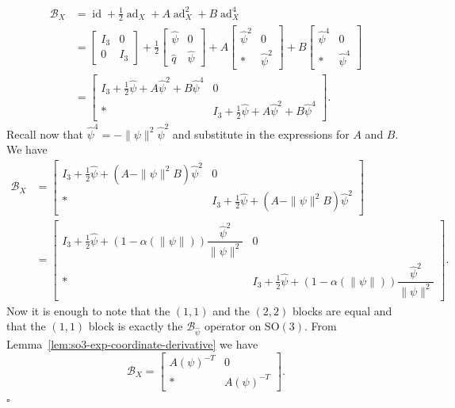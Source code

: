 \documentclass[11pt]{article}
\newcommand{\SO}{\mathrm{SO}}
\newcommand{\ad}{\operatorname{ad}}
\newcommand{\id}{\operatorname{id}}
\newcommand{\calB}{\mathcal B}
\newcommand{\proofbox}{\hfill$\square$}
\begin{document}
\begin{align*}
\calB_X
&=\id+\frac12\ad_X+A\ad_X^2+B\ad_X^4\\
&=\begin{bmatrix}I_3&0\\0&I_3\end{bmatrix}
+\frac12\begin{bmatrix}\widehat\psi&0\\\widehat q&\widehat\psi\end{bmatrix}
+A\begin{bmatrix}\widehat\psi^2&0\\ *&\widehat\psi^2\end{bmatrix}
+B\begin{bmatrix}\widehat\psi^4&0\\ *&\widehat\psi^4\end{bmatrix}\\
&=\begin{bmatrix}
I_3+\frac12\widehat\psi+A\widehat\psi^2+B\widehat\psi^4&0\\
*&I_3+\frac12\widehat\psi+A\widehat\psi^2+B\widehat\psi^4
\end{bmatrix}.
\end{align*}
Recall now that $\widehat\psi^4=-\|\psi\|^2\widehat\psi^2$ and substitute in the expressions for $A$ and $B$. We have
\begin{align*}
\calB_X
&=\begin{bmatrix}
I_3+\frac12\widehat\psi+(A-\|\psi\|^2B)\widehat\psi^2&0\\
*&I_3+\frac12\widehat\psi+(A-\|\psi\|^2B)\widehat\psi^2
\end{bmatrix}\\
&=\begin{bmatrix}
I_3+\frac12\widehat\psi+(1-\alpha(\|\psi\|))\dfrac{\widehat\psi^2}{\|\psi\|^2}&0\\
*&I_3+\frac12\widehat\psi+(1-\alpha(\|\psi\|))\dfrac{\widehat\psi^2}{\|\psi\|^2}
\end{bmatrix}.
\end{align*}
Now it is enough to note that the $(1,1)$ and the $(2,2)$ blocks are equal and that the $(1,1)$ block is exactly the $\calB_{\widehat\psi}$ operator on $\SO(3)$. From Lemma~\ref{lem:so3-exp-coordinate-derivative} we have
\begin{equation*}
\calB_X=\begin{bmatrix}A(\psi)^{-T}&0\\ *&A(\psi)^{-T}\end{bmatrix}.
\end{equation*}
\proofbox
\end{document}
